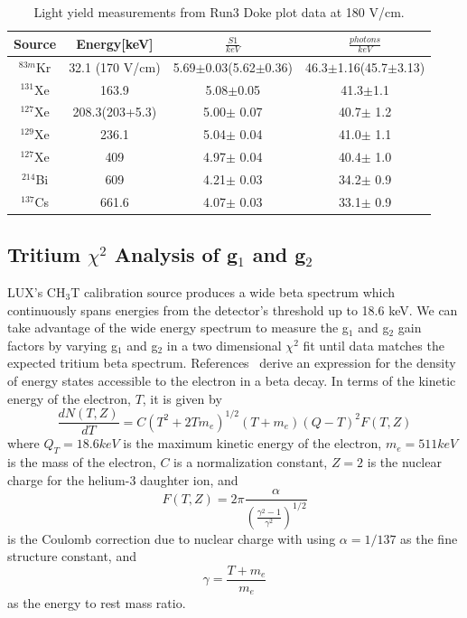 \begin{center}
\begin{table}[H]
\begin{tabular}{ | c | c | c | c |}
\hline
Source & Energy[keV] & $\frac{S1}{keV}$ & $\frac{photons}{keV}$ \\ \hline
$^{83m}$Kr & 32.1 (170 V/cm) & 5.69$\pm$0.03(5.62$\pm$0.36) & 46.3$\pm$1.16(45.7$\pm$3.13) \\  \hline
$^{131}$Xe & 163.9 & 5.08$\pm$0.05 & 41.3$\pm$1.1\\  \hline
$^{127}$Xe & 208.3(203+5.3) & 5.00$\pm$ 0.07 & 40.7$\pm$ 1.2\\  \hline
$^{129}$Xe & 236.1 & 5.04$\pm$ 0.04 & 41.0$\pm$ 1.1\\  \hline
$^{127}$Xe & 409 & 4.97$\pm$ 0.04 & 40.4$\pm$ 1.0\\  \hline
$^{214}$Bi & 609 & 4.21$\pm$ 0.03 & 34.2$\pm$ 0.9\\  \hline
$^{137}$Cs & 661.6 & 4.07$\pm$ 0.03 & 33.1$\pm$ 0.9\\ 
\hline
\end{tabular}
\caption{Light yield measurements from Run3 Doke plot data at 180 V/cm.}
\label{LY}
\end{table}
\end{center}


\subsection{Tritium $\chi^2$ Analysis of g$_1$ and g$_2$}

LUX's CH$_3$T calibration source produces a wide beta spectrum which continuously spans energies from the detector's threshold up to 18.6 keV.  We can take advantage of the wide energy spectrum to measure the g$_1$ and g$_2$ gain factors by varying g$_1$ and g$_2$ in a two dimensional $\chi^2$ fit until data matches the expected tritium beta spectrum.  References~\cite{TritiumSpec,TritiumSpec2,TritiumSpec3} derive an expression for the density of energy states accessible to the electron in a beta decay.  In terms of the kinetic energy of the electron, $T$, it is given by
\begin{equation} \label{TritiumBetaShape}
\frac{dN(T,Z)}{dT} = C(T^2 + 2Tm_e)^{1/2}(T+m_e)(Q-T)^2F(T,Z)
\end{equation}
where $Q_T=18.6 keV$ is the maximum kinetic energy of the electron, $m_e=511 keV$ is the mass of the electron, $C$ is a normalization constant, $Z=2$ is the nuclear charge for the helium-3 daughter ion, and 
\begin{equation}
F(T,Z) = 2\pi \frac{\alpha}{\left( \frac{\gamma^2 -1 }{\gamma^2}\right) ^{1/2}} 
\end{equation}
is the Coulomb correction due to nuclear charge with using $\alpha=1/137$ as the fine structure constant, and
\begin{equation}
\gamma = \frac{T+m_e}{m_e}
\end{equation}
as the energy to rest mass ratio.


